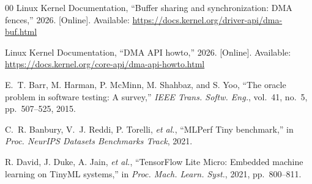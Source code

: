 \documentclass[lettersize,journal]{IEEEtran}
\begin{document}
\begin{thebibliography}{00}
Linux Kernel Documentation, ``Buffer sharing and synchronization: DMA
fences,'' 2026. [Online]. Available:
\url{https://docs.kernel.org/driver-api/dma-buf.html}

Linux Kernel Documentation, ``DMA API howto,'' 2026. [Online]. Available:
\url{https://docs.kernel.org/core-api/dma-api-howto.html}

E.~T. Barr, M. Harman, P. McMinn, M. Shahbaz, and S. Yoo, ``The oracle problem
in software testing: A survey,'' \emph{IEEE Trans. Softw. Eng.}, vol.~41,
no.~5, pp.~507--525, 2015.

C.~R. Banbury, V.~J. Reddi, P. Torelli, \emph{et al.}, ``MLPerf Tiny
benchmark,'' in \emph{Proc. NeurIPS Datasets Benchmarks Track}, 2021.

R. David, J. Duke, A. Jain, \emph{et al.}, ``TensorFlow Lite Micro: Embedded
machine learning on TinyML systems,'' in \emph{Proc. Mach. Learn. Syst.},
2021, pp.~800--811.

\end{thebibliography}
\end{document}
